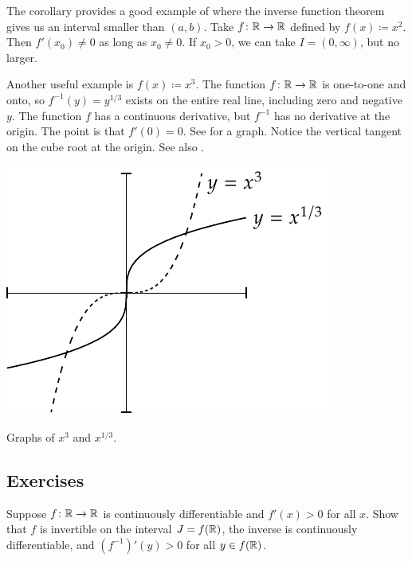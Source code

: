 \begin{example}
The corollary provides a good example of where the inverse function theorem
gives us an interval smaller than $(a,b)$.  Take $f \colon {\mathbb{R}} \to {\mathbb{R}}$
defined by $f(x) \coloneqq x^2$.  Then $f'(x_0) \not= 0$
as long as $x_0 \not= 0$.  If $x_0 > 0$, we can take $I=(0,\infty)$, but
no larger.
\end{example}

\begin{example}
Another useful example is $f(x) \coloneqq x^3$.  The function $f \colon {\mathbb{R}} \to {\mathbb{R}}$ is
one-to-one and onto, so $f^{-1}(y) = y^{1/3}$ exists on the entire real
line, including zero and negative $y$.  The function $f$ has
a continuous derivative, but $f^{-1}$ has no derivative at the origin.  The
point is that $f'(0) = 0$.  See  for a graph.
Notice the vertical tangent on the cube root at the origin.
See also .
\begin{myfigureht}
\includegraphics{figures/cubecuberoot}
\caption{Graphs of $x^3$ and $x^{1/3}$.\label{cubecuberootfig}}
\end{myfigureht}
\end{example}


\subsection{Exercises}

\begin{exercise}
Suppose $f \colon {\mathbb{R}} \to {\mathbb{R}}$ is continuously differentiable and
$f'(x) > 0$ for all $x$.  Show that $f$ is invertible on the interval $J =
f({\mathbb{R}})$, the inverse is continuously differentiable, and ${(f^{-1})}'(y) >
0$ for all $y \in f({\mathbb{R}})$.
\end{exercise}

